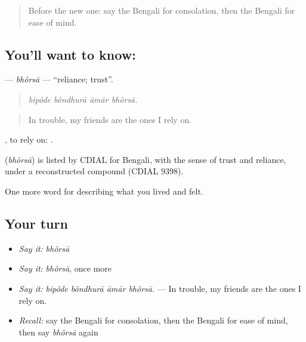 \label{lesson:BN-C446-bhorsa}



\begin{quote}
Before the new one: say the Bengali for consolation, then the Bengali for ease of mind.
\end{quote}

\subsection*{You'll want to know: }
\textbf{} — \emph{bhôrsā} — \textquotedblleft{}reliance; trust\textquotedblright{}.

\begin{quote}
   
\end{quote}

\begin{quote}
\emph{bipôde bôndhurā āmār bhôrsā.}
\end{quote}

\begin{quote}
In trouble, my friends are the ones I rely on.
\end{quote}

 , to rely on:     .

\begin{cousinweb}
\textbf{} (\emph{bhôrsā}) is listed by CDIAL for Bengali, with the sense of trust and reliance, under a reconstructed compound (CDIAL 9398).
\end{cousinweb}

\begin{grammarlens}[title={What you've built}]
One more word for describing what you lived and felt.
\end{grammarlens}

\subsection*{Your turn}
\begin{itemize}
\raggedright
  \item \emph{Say it:} \emph{bhôrsā}
  \item \emph{Say it:} \emph{bhôrsā}, once more
  \item \emph{Say it:} \emph{bipôde bôndhurā āmār bhôrsā.} — In trouble, my friends are the ones I rely on.
  \item \emph{Recall:} say the Bengali for consolation, then the Bengali for ease of mind, then say \emph{bhôrsā} again
\end{itemize}

